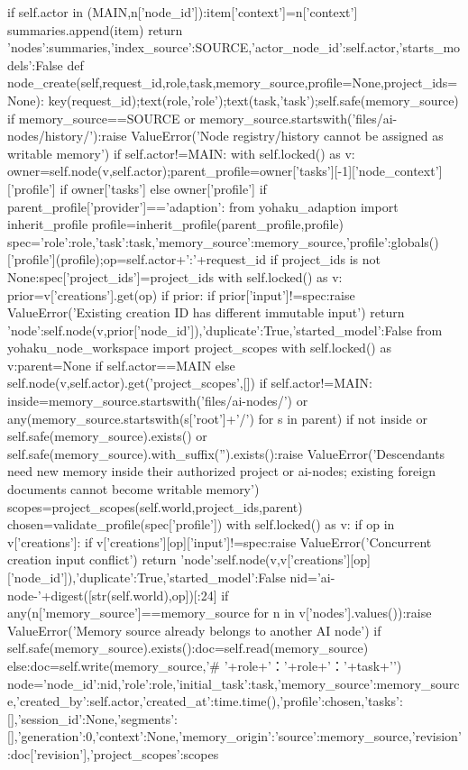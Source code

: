     if self.actor in (MAIN,n['node_id']):item['context']=n['context']
    summaries.append(item)
   return {'nodes':summaries,'index_source':SOURCE,'actor_node_id':self.actor,'starts_models':False}
 def node_create(self,request_id,role,task,memory_source,profile=None,project_ids=None):
  key(request_id);text(role,'role');text(task,'task');self.safe(memory_source)
  if memory_source==SOURCE or memory_source.startswith('files/ai-nodes/history/'):raise ValueError('Node registry/history cannot be assigned as writable memory')
  if self.actor!=MAIN:
   with self.locked() as v:
    owner=self.node(v,self.actor);parent_profile=owner['tasks'][-1]['node_context']['profile'] if owner['tasks'] else owner['profile']
   if parent_profile['provider']=='adaption':
    from yohaku_adaption import inherit_profile
    profile=inherit_profile(parent_profile,profile)
  spec={'role':role,'task':task,'memory_source':memory_source,'profile':globals()['profile'](profile)};op=self.actor+':'+request_id
  if project_ids is not None:spec['project_ids']=project_ids
  with self.locked() as v:
   prior=v['creations'].get(op)
   if prior:
    if prior['input']!=spec:raise ValueError('Existing creation ID has different immutable input')
    return {'node':self.node(v,prior['node_id']),'duplicate':True,'started_model':False}
  from yohaku_node_workspace import project_scopes
  with self.locked() as v:parent=None if self.actor==MAIN else self.node(v,self.actor).get('project_scopes',[])
  if self.actor!=MAIN:
   inside=memory_source.startswith('files/ai-nodes/') or any(memory_source.startswith(s['root']+'/') for s in parent)
   if not inside or self.safe(memory_source).exists() or self.safe(memory_source).with_suffix('').exists():raise ValueError('Descendants need new memory inside their authorized project or ai-nodes; existing foreign documents cannot become writable memory')
  scopes=project_scopes(self.world,project_ids,parent)
  chosen=validate_profile(spec['profile'])
  with self.locked() as v:
   if op in v['creations']:
    if v['creations'][op]['input']!=spec:raise ValueError('Concurrent creation input conflict')
    return {'node':self.node(v,v['creations'][op]['node_id']),'duplicate':True,'started_model':False}
   nid='ai-node-'+digest([str(self.world),op])[:24]
   if any(n['memory_source']==memory_source for n in v['nodes'].values()):raise ValueError('Memory source already belongs to another AI node')
   if self.safe(memory_source).exists():doc=self.read(memory_source)
   else:doc=self.write(memory_source,'# '+role+'\n{}：'+role+'：'+task+'\n')
   node={'node_id':nid,'role':role,'initial_task':task,'memory_source':memory_source,'created_by':self.actor,'created_at':time.time(),'profile':chosen,'tasks':[],'session_id':None,'segments':[],'generation':0,'context':None,'memory_origin':{'source':memory_source,'revision':doc['revision']},'project_scopes':scopes}
